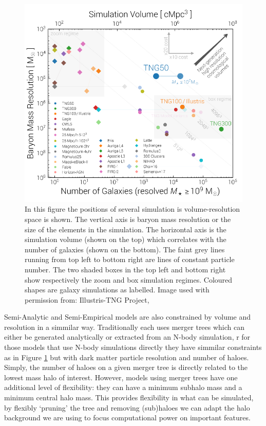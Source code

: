 \begin{figure}[h]
    \centering
    \includegraphics[width = \linewidth]{Figures/Chapter2/VolumeResolutionComparison.png}
    \caption{In this figure the positions of several simulation is volume-resolution space is shown. The vertical axis is baryon mass resolution or the size of the elements in the simulation. The horizontal axis is the simulation volume (shown on the top) which correlates with the number of galaxies (shown on the bottom). The faint grey lines running from top left to bottom right are lines of constant particle number. The two shaded boxes in the top left and bottom right show respectively the zoom and box simulation regimes. Coloured shapes are galaxy simulations as labelled. 
    Image used with permission from: Illustris-TNG Project, \citet{Nelson2019FirstFeedback}}
    \label{fig:Vol_v_Res}
\end{figure}

Semi-Analytic and Semi-Empirical models are also constrained by volume and resolution in a simmilar way. Traditionally each uses merger trees which can either be generated analytically or extracted from an N-body simulation, r
for those models that use N-body simulations directly they have simmilar constraints as in Figure \ref{fig:Vol_v_Res} but with dark matter particle resolution and number of haloes. Simply, the number of haloes on a given merger tree is directly related to the lowest mass halo of interest. However, models using merger trees have one additional level of flexibility: they can have a minimum subhalo mass and a minimum central halo mass. This provides flexibility in what can be simulated, by flexibly `pruning' the tree and removing (sub)haloes we can adapt the halo background we are using to focus computational power on important features. 

